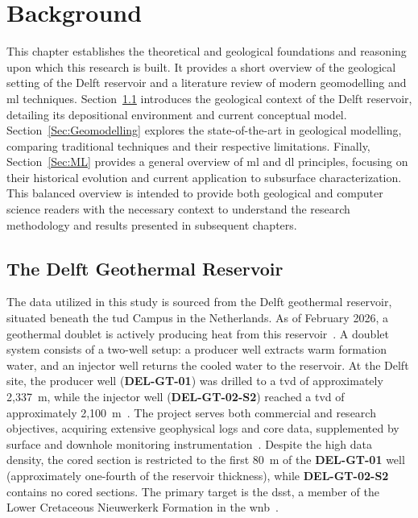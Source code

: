\chapter{Background}\label{Ch:Background}
This chapter establishes the theoretical and geological foundations and reasoning upon which this research is built. It provides a short overview of the geological setting of the Delft reservoir and a literature review of modern geomodelling and \gls{ml} techniques. Section~\ref{Sec:Delft_Reservoir} introduces the geological context of the Delft reservoir, detailing its depositional environment and current conceptual model. Section~\ref{Sec:Geomodelling} explores the state-of-the-art in geological modelling, comparing traditional techniques and their respective limitations. Finally, Section~\ref{Sec:ML} provides a general overview of \gls{ml} and \gls{dl} principles, focusing on their historical evolution and current application to subsurface characterization. This balanced overview is intended to provide both geological and computer science readers with the necessary context to understand the research methodology and results presented in subsequent chapters.

\section{The Delft Geothermal Reservoir}\label{Sec:Delft_Reservoir}
The data utilized in this study is sourced from the Delft geothermal reservoir, situated beneath the \gls{tud} Campus in the Netherlands. 
As of February 2026, a geothermal doublet is actively producing heat from this reservoir~\parencite{beerda2026geothermie}. A doublet system consists of a two-well setup: a producer well extracts warm formation water, and an injector well returns the cooled water to the reservoir. At the Delft site, the producer well (\textbf{DEL-GT-01}) was drilled to a \gls{tvd} of approximately 2,337~m, while the injector well (\textbf{DEL-GT-02-S2}) reached a \gls{tvd} of approximately 2,100~m~\parencite{vardon2024endofwell}. The project serves both commercial and research objectives, acquiring extensive geophysical logs and core data, supplemented by surface and downhole monitoring instrumentation~\parencite{vardon2020geothermal, vardon2024endofwell}. Despite the high data density, the cored section is restricted to the first 80~m of the \textbf{DEL-GT-01} well (approximately one-fourth of the reservoir thickness), while \textbf{DEL-GT-02-S2} contains no cored sections. The primary target is the \gls{dsst}, a member of the Lower Cretaceous Nieuwerkerk Formation in the \gls{wnb}~\parencite{donselaar2015reservoir}.


